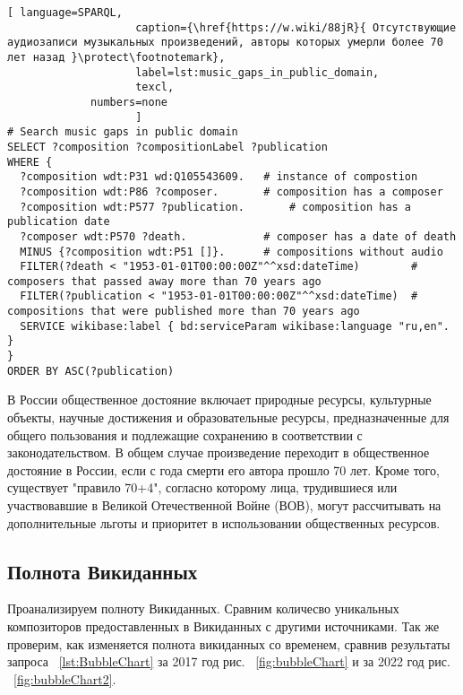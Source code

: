 \begin{lstlisting}[ language=SPARQL,
                    caption={\href{https://w.wiki/88jR}{ Отсутствующие аудиозаписи музыкальных произведений, авторы которых умерли более 70 лет назад }\protect\footnotemark},
                    label=lst:music_gaps_in_public_domain,
                    texcl,
	         numbers=none
                    ]
# Search music gaps in public domain
SELECT ?composition ?compositionLabel ?publication
WHERE {
  ?composition wdt:P31 wd:Q105543609.	# instance of compostion
  ?composition wdt:P86 ?composer.		# composition has a composer
  ?composition wdt:P577 ?publication.		# composition has a publication date
  ?composer wdt:P570 ?death.			# composer has a date of death
  MINUS {?composition wdt:P51 []}.		# compositions without audio 
  FILTER(?death < "1953-01-01T00:00:00Z"^^xsd:dateTime)        # composers that passed away more than 70 years ago
  FILTER(?publication < "1953-01-01T00:00:00Z"^^xsd:dateTime)  # compositions that were published more than 70 years ago
  SERVICE wikibase:label { bd:serviceParam wikibase:language "ru,en". }
}
ORDER BY ASC(?publication)
\end{lstlisting}%

В России общественное достояние включает природные ресурсы, культурные объекты, научные достижения и образовательные ресурсы, предназначенные для общего пользования и подлежащие сохранению в соответствии с законодательством. В общем случае произведение переходит в общественное достояние в России, если с года смерти его автора прошло 70 лет. Кроме того, существует "правило 70+4", согласно которому лица, трудившиеся или участвовавшие в Великой Отечественной Войне (ВОВ), могут рассчитывать на дополнительные льготы и приоритет в использовании общественных ресурсов.

\subsection{Полнота Викиданных}
Проанализируем полноту Викиданных. Сравним количесво уникальных композиторов предоставленных в Викиданных с другими источниками. Так же проверим, как изменяется полнота викиданных со временем, сравнив результаты запроса ~\ref{lst:BubbleChart} за 2017 год рис. ~\ref{fig:bubbleChart} и за 2022 год рис. ~\ref{fig:bubbleChart2}.

